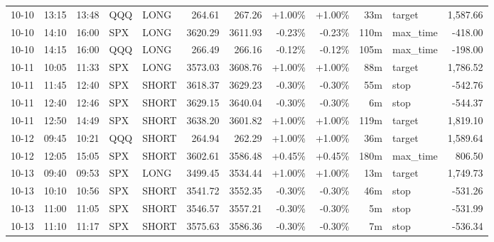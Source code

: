 \documentclass[11pt,a4paper,twoside]{article}
\begin{document}
\begin{center}
\begin{longtable}{>{\color{txtmain}}l l l l l r r r r r >{\color{txtmain}}l r}
10-10 & 13:15 & 13:48 & QQQ & LONG & 264.61 & 267.26 & \textcolor{wingreen}{+1.00\%} & \textcolor{wingreen}{+1.00\%} & 33m & target & \textcolor{wingreen}{1,587.66} \\
10-10 & 14:10 & 16:00 & SPX & LONG & 3620.29 & 3611.93 & \textcolor{lossred}{-0.23\%} & \textcolor{lossred}{-0.23\%} & 110m & max\_time & \textcolor{lossred}{-418.00} \\
10-10 & 14:15 & 16:00 & QQQ & LONG & 266.49 & 266.16 & \textcolor{lossred}{-0.12\%} & \textcolor{lossred}{-0.12\%} & 105m & max\_time & \textcolor{lossred}{-198.00} \\
10-11 & 10:05 & 11:33 & SPX & LONG & 3573.03 & 3608.76 & \textcolor{wingreen}{+1.00\%} & \textcolor{wingreen}{+1.00\%} & 88m & target & \textcolor{wingreen}{1,786.52} \\
10-11 & 11:45 & 12:40 & SPX & SHORT & 3618.37 & 3629.23 & \textcolor{lossred}{-0.30\%} & \textcolor{lossred}{-0.30\%} & 55m & stop & \textcolor{lossred}{-542.76} \\
10-11 & 12:40 & 12:46 & SPX & SHORT & 3629.15 & 3640.04 & \textcolor{lossred}{-0.30\%} & \textcolor{lossred}{-0.30\%} & 6m & stop & \textcolor{lossred}{-544.37} \\
10-11 & 12:50 & 14:49 & SPX & SHORT & 3638.20 & 3601.82 & \textcolor{wingreen}{+1.00\%} & \textcolor{wingreen}{+1.00\%} & 119m & target & \textcolor{wingreen}{1,819.10} \\
10-12 & 09:45 & 10:21 & QQQ & SHORT & 264.94 & 262.29 & \textcolor{wingreen}{+1.00\%} & \textcolor{wingreen}{+1.00\%} & 36m & target & \textcolor{wingreen}{1,589.64} \\
10-12 & 12:05 & 15:05 & SPX & SHORT & 3602.61 & 3586.48 & \textcolor{wingreen}{+0.45\%} & \textcolor{wingreen}{+0.45\%} & 180m & max\_time & \textcolor{wingreen}{806.50} \\
10-13 & 09:40 & 09:53 & SPX & LONG & 3499.45 & 3534.44 & \textcolor{wingreen}{+1.00\%} & \textcolor{wingreen}{+1.00\%} & 13m & target & \textcolor{wingreen}{1,749.73} \\
10-13 & 10:10 & 10:56 & SPX & SHORT & 3541.72 & 3552.35 & \textcolor{lossred}{-0.30\%} & \textcolor{lossred}{-0.30\%} & 46m & stop & \textcolor{lossred}{-531.26} \\
10-13 & 11:00 & 11:05 & SPX & SHORT & 3546.57 & 3557.21 & \textcolor{lossred}{-0.30\%} & \textcolor{lossred}{-0.30\%} & 5m & stop & \textcolor{lossred}{-531.99} \\
10-13 & 11:10 & 11:17 & SPX & SHORT & 3575.63 & 3586.36 & \textcolor{lossred}{-0.30\%} & \textcolor{lossred}{-0.30\%} & 7m & stop & \textcolor{lossred}{-536.34} \\

\end{longtable}
\end{center}
\end{document}
